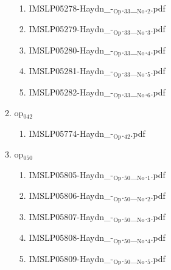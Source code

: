 \documentclass[11pt]{article}
\begin{document}
\begin{enumerate}
\begin{enumerate}
\begin{enumerate}
\item IMSLP05278-Haydn\_-$_{\text{Op}}$.$_{\text{33}}$\_$_{\text{No}}$.$_{\text{2}}$.pdf
\label{sec-1-1-1-1-44-38-6-7-2}

\item IMSLP05279-Haydn\_-$_{\text{Op}}$.$_{\text{33}}$\_$_{\text{No}}$.$_{\text{3}}$.pdf
\label{sec-1-1-1-1-44-38-6-7-3}

\item IMSLP05280-Haydn\_-$_{\text{Op}}$.$_{\text{33}}$\_$_{\text{No}}$.$_{\text{4}}$.pdf
\label{sec-1-1-1-1-44-38-6-7-4}

\item IMSLP05281-Haydn\_-$_{\text{Op}}$.$_{\text{33}}$\_$_{\text{No}}$.$_{\text{5}}$.pdf
\label{sec-1-1-1-1-44-38-6-7-5}

\item IMSLP05282-Haydn\_-$_{\text{Op}}$.$_{\text{33}}$\_$_{\text{No}}$.$_{\text{6}}$.pdf
\label{sec-1-1-1-1-44-38-6-7-6}
\end{enumerate}

\item op$_{\text{042}}$
\label{sec-1-1-1-1-44-38-6-8}
\begin{enumerate}
\item IMSLP05774-Haydn\_-$_{\text{Op}}$.$_{\text{42}}$.pdf
\label{sec-1-1-1-1-44-38-6-8-1}
\end{enumerate}

\item op$_{\text{050}}$
\label{sec-1-1-1-1-44-38-6-9}
\begin{enumerate}
\item IMSLP05805-Haydn\_-$_{\text{Op}}$.$_{\text{50}}$\_$_{\text{No}}$.$_{\text{1}}$.pdf
\label{sec-1-1-1-1-44-38-6-9-1}

\item IMSLP05806-Haydn\_-$_{\text{Op}}$.$_{\text{50}}$\_$_{\text{No}}$.$_{\text{2}}$.pdf
\label{sec-1-1-1-1-44-38-6-9-2}

\item IMSLP05807-Haydn\_-$_{\text{Op}}$.$_{\text{50}}$\_$_{\text{No}}$.$_{\text{3}}$.pdf
\label{sec-1-1-1-1-44-38-6-9-3}

\item IMSLP05808-Haydn\_-$_{\text{Op}}$.$_{\text{50}}$\_$_{\text{No}}$.$_{\text{4}}$.pdf
\label{sec-1-1-1-1-44-38-6-9-4}

\item IMSLP05809-Haydn\_-$_{\text{Op}}$.$_{\text{50}}$\_$_{\text{No}}$.$_{\text{5}}$.pdf
\label{sec-1-1-1-1-44-38-6-9-5}


\end{enumerate}
\end{enumerate}
\end{enumerate}
\end{document}
